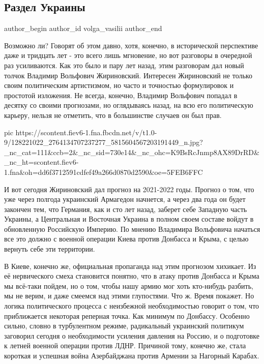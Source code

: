  
 
 
 
 
 
\subsection{Раздел Украины}
\label{sec:28_11_2020.fb.volga_vasilii.1.razdel_ukrainy}
\ifcmt
	author_begin
   author_id volga_vasilii
	author_end
\fi

Возможно ли? Говорят об этом давно, хотя, конечно, в исторической перспективе
даже и тридцать лет - это всего лишь мгновение, но вот разговоры в очередной
раз усиливаются. Как это было и пару лет назад, этим разговорам дал новый
толчок Владимир Вольфович Жириновский.  Интересен Жириновский не только своим
политическим артистизмом, но часто и точностью формулировок и простотой
изложения. Не всегда, конечно, Владимир Вольфович попадал в десятку со своими
прогнозами, но оглядываясь назад, на всю его политическую карьеру, нельзя не
отметить, что в большинстве случаев он был прав. 

\ifcmt
pic https://scontent.fiev6-1.fna.fbcdn.net/v/t1.0-9/128221022_2764134707237277_5815604567203191449_n.jpg?_nc_cat=111&ccb=2&_nc_sid=730e14&_nc_ohc=K9BsRcJnmp8AX89DrRD&_nc_ht=scontent.fiev6-1.fna&oh=dd6f3712591cdfef49a266d0870d2590&oe=5FEB6FFC
\fi

И вот сегодня Жириновский дал прогноз на 2021-2022 годы. Прогноз о том, что уже
через полгода украинский Армагедон начнется, а через два года он будет закончен
тем, что Германия, как и сто лет назад, заберет себе Западную часть Украины, а
Центральная и Восточная Украина в полном своем составе войдут в обновленную
Российскую Империю. По мнению Владимира Вольфовича начаться все это должно с
военной операции Киева против Донбасса и Крыма, с целью вернуть себе эти
территории. 

В Киеве, конечно же, официальная пропаганда над этим прогнозом хихикает. Из её
нервического смеха становится понятно, что в атаку против Донбасса и Крыма мы
всё-таки пойдем, но о том, чтобы нашу армию мог хоть кто-нибудь разбить, мы не
верим, и даже смеемся над этими глупостями.  Что ж. Время покажет. Но логика
политического процесса с неизбежной необходимостью говорит о том, что
приближается некоторая реперная точка. Как минимум по Донбассу. Особенно
сильно, словно в турбулентном режиме, радикальный украинский политикум
заговорил сегодня о необходимости усиления давления на Россию, и о подготовке к
летней военной операции против ЛДНР. Причиной тому, конечно же, стала короткая
и успешная война Азербайджана против Армении за Нагорный Карабах. 

